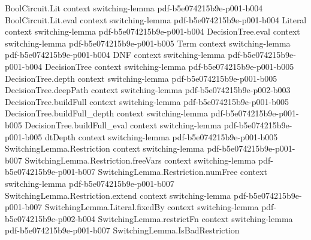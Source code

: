\begin{lemma}
\label{SwitchingLemma.razborovEncode_aux_length_le}
\leanok
{}
\proofstep
  {BoolCircuit.Lit}
  {context}
  {switching-lemma}
  {pdf-b5e074215b9e-p001-b004}
\proofstep
  {BoolCircuit.Lit.eval}
  {context}
  {switching-lemma}
  {pdf-b5e074215b9e-p001-b004}
\proofstep
  {Literal}
  {context}
  {switching-lemma}
  {pdf-b5e074215b9e-p001-b004}
\proofstep
  {DecisionTree.eval}
  {context}
  {switching-lemma}
  {pdf-b5e074215b9e-p001-b005}
\proofstep
  {Term}
  {context}
  {switching-lemma}
  {pdf-b5e074215b9e-p001-b004}
\proofstep
  {DNF}
  {context}
  {switching-lemma}
  {pdf-b5e074215b9e-p001-b004}
\proofstep
  {DecisionTree}
  {context}
  {switching-lemma}
  {pdf-b5e074215b9e-p001-b005}
\proofstep
  {DecisionTree.depth}
  {context}
  {switching-lemma}
  {pdf-b5e074215b9e-p001-b005}
\proofstep
  {DecisionTree.deepPath}
  {context}
  {switching-lemma}
  {pdf-b5e074215b9e-p002-b003}
\proofstep
  {DecisionTree.buildFull}
  {context}
  {switching-lemma}
  {pdf-b5e074215b9e-p001-b005}
\proofstep
  {DecisionTree.buildFull_depth}
  {context}
  {switching-lemma}
  {pdf-b5e074215b9e-p001-b005}
\proofstep
  {DecisionTree.buildFull_eval}
  {context}
  {switching-lemma}
  {pdf-b5e074215b9e-p001-b005}
\proofstep
  {dtDepth}
  {context}
  {switching-lemma}
  {pdf-b5e074215b9e-p001-b005}
\proofstep
  {SwitchingLemma.Restriction}
  {context}
  {switching-lemma}
  {pdf-b5e074215b9e-p001-b007}
\proofstep
  {SwitchingLemma.Restriction.freeVars}
  {context}
  {switching-lemma}
  {pdf-b5e074215b9e-p001-b007}
\proofstep
  {SwitchingLemma.Restriction.numFree}
  {context}
  {switching-lemma}
  {pdf-b5e074215b9e-p001-b007}
\proofstep
  {SwitchingLemma.Restriction.extend}
  {context}
  {switching-lemma}
  {pdf-b5e074215b9e-p001-b007}
\proofstep
  {SwitchingLemma.Literal.fixedBy}
  {context}
  {switching-lemma}
  {pdf-b5e074215b9e-p002-b004}
\proofstep
  {SwitchingLemma.restrictFn}
  {context}
  {switching-lemma}
  {pdf-b5e074215b9e-p001-b007}
\proofstep
  {SwitchingLemma.IsBadRestriction}

\end{lemma}
